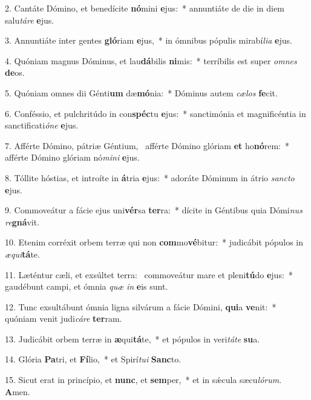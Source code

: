 2. Cantáte Dómino, et benedícite \textbf{nó}mini \textbf{e}jus:~*  annuntiáte de die in diem salu\textit{tá}\textit{re} \textbf{e}jus.\

3. Annuntiáte inter gentes \textbf{gló}riam \textbf{e}jus,~*  in ómnibus pópulis mirabí\textit{li}\textit{a} \textbf{e}jus.\

4. Quóniam magnus Dóminus, et lau\textbf{dá}bilis \textbf{ni}mis:~*  terríbilis est super \textit{om}\textit{nes} \textbf{de}os.\

5. Quóniam omnes dii Génti\textbf{um} dæ\textbf{mó}nia:~*  Dóminus autem \textit{cæ}\textit{los} \textbf{fe}cit.\

6. Conféssio, et pulchritúdo in con\textbf{spéc}tu \textbf{e}jus:~*  sanctimónia et magnificéntia in sanctificati\textit{ó}\textit{ne} \textbf{e}jus.\

7. Afférte Dómino, pátriæ Géntium, \dag\  afférte Dómino glóriam \textbf{et} ho\textbf{nó}rem:~*  afférte Dómino glóriam nó\textit{mi}\textit{ni} \textbf{e}jus.\

8. Tóllite hóstias, et introíte in \textbf{á}tria \textbf{e}jus:~*  adoráte Dóminum in átrio \textit{sanc}\textit{to} \textbf{e}jus.\

9. Commoveátur a fácie ejus uni\textbf{vér}sa \textbf{ter}ra:~*  dícite in Géntibus quia Dómi\textit{nus} \textit{re}\textbf{gná}vit.\

10. Etenim corréxit orbem terræ qui non \textbf{com}mo\textbf{vé}bitur:~*  judicábit pópulos in \textit{æ}\textit{qui}\textbf{tá}te.\

11. Læténtur cæli, et exsúltet terra: \dag\  commoveátur mare et pleni\textbf{tú}do \textbf{e}jus:~*  gaudébunt campi, et ómnia \textit{quæ} \textit{in} \textbf{e}is sunt.\

12. Tunc exsultábunt ómnia ligna silvárum a fácie Dómini, \textbf{qui}a \textbf{ve}nit:~*  quóniam venit judi\textit{cá}\textit{re} \textbf{ter}ram.\

13. Judicábit orbem terræ in \textbf{æ}qui\textbf{tá}te,~*  et pópulos in veri\textit{tá}\textit{te} \textbf{su}a.\

14. Glória \textbf{Pa}tri, et \textbf{Fí}lio,~*  et Spirí\textit{tu}\textit{i} \textbf{Sanc}to.\

15. Sicut erat in princípio, et \textbf{nunc}, et \textbf{sem}per,~*  et in sǽcula sæcu\textit{ló}\textit{rum}. \textbf{A}men.\

